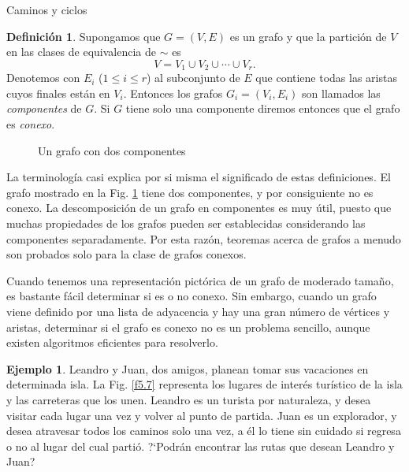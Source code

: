 \documentclass[11pt,spanish,makeidx]{amsbook}
\theoremstyle{definition}
\newtheorem{definicion}{Definici\'on}[section]
\newtheorem{ejemplo}{Ejemplo}[section]
\theoremstyle{remark}
\begin{document}
\begin{section}{Caminos y ciclos}
\begin{definicion}Supongamos que $G=(V,E)$ es un grafo y que la partición de $V$ en las clases de equivalencia de $\sim$ es
$$
V= V_1 \cup V_2 \cup \cdots \cup V_r.
$$
Denotemos con $E_i$ ($1\le i \le r$) al subconjunto de $E$ que contiene todas las aristas cuyos finales están en $V_i$. Entonces los grafos $G_i=(V_i,E_i)$ son llamados las {\em componentes}     de $G$. Si $G$ tiene solo una componente diremos entonces que el grafo es {\em conexo}.
\end{definicion}

\begin{figure}[t]
\caption{Un grafo con dos componentes} \label{f5.6}
\end{figure}

La terminología casi explica por si misma el significado de estas definiciones. El grafo mostrado en la Fig. \ref{f5.6} tiene dos componentes, y por consiguiente no es conexo. La descomposición de un grafo en componentes es muy útil, puesto que muchas propiedades de los grafos pueden ser establecidas considerando las componentes separadamente. Por esta razón, teoremas acerca de grafos a menudo son probados solo para la clase de grafos conexos.

Cuando tenemos una representación pictórica de un grafo de moderado tamaño, es bastante fácil determinar si es o no conexo. Sin embargo, cuando un grafo viene definido por una lista de adyacencia y hay una gran número de vértices y aristas, determinar si el grafo es conexo no es un problema sencillo, aunque existen  algoritmos eficientes para resolverlo.

\begin{ejemplo}\label{chunner} Leandro y Juan, dos amigos, planean tomar sus vacaciones en determinada isla. La Fig. \ref{f5.7} representa los lugares de interés turístico de la isla y las carreteras que los unen. Leandro es un turista por naturaleza, y desea visitar cada lugar una vez y volver al punto de partida. Juan es un explorador, y desea atravesar todos los caminos solo una vez, a él lo tiene sin cuidado si regresa o no al lugar del cual partió. ?`Podrán encontrar las rutas que desean Leandro y Juan?
\end{ejemplo}


\end{section}
\end{document}
